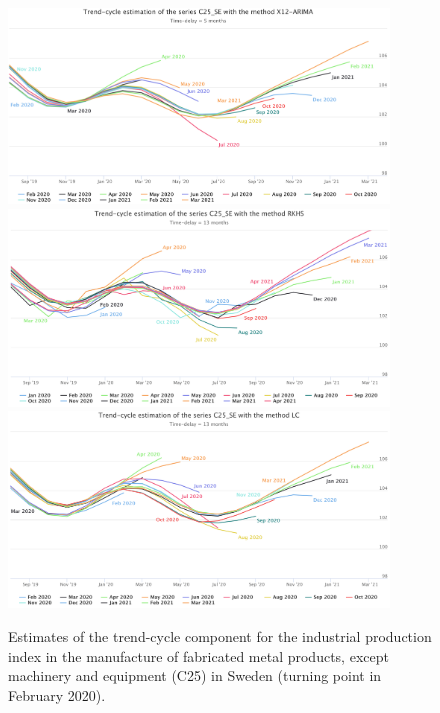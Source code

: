 \documentclass[fleqn,10pt]{latex/stylish_article} %
\newcommand\1{\mathds{1}}
\begin{document}
\begin{figure}\centering
\includegraphics[width=0.9\textwidth]{img/C25SE_x13}
\includegraphics[width=0.9\textwidth]{img/C25SE_rkhs} 
\includegraphics[width=0.9\textwidth]{img/C25SE_lc}
\caption{Estimates of the trend-cycle component for the industrial production index in the manufacture of fabricated metal products, except machinery and equipment (C25) in Sweden (turning point in February 2020).}
\label{fig:C25SEp1}
\end{figure}
\end{document}
